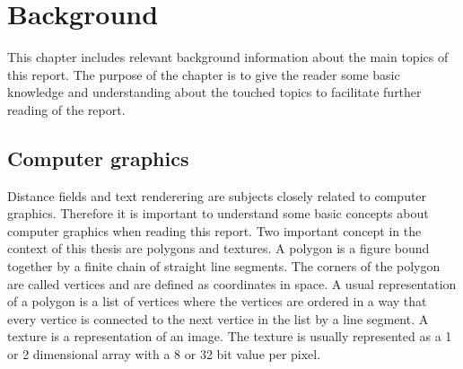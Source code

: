 \chapter{Background}\label{cha:theory}
This chapter includes relevant background information about the main topics of this report. The purpose of the chapter is to give the reader some basic knowledge and understanding about the touched topics to facilitate further reading of the report.
\section{Computer graphics}\label{computergraphics}
Distance fields and text renderering are subjects closely related to computer graphics. Therefore it is important to understand some basic concepts about computer graphics when reading this report. Two important concept in the context of this thesis are polygons and textures. A polygon is a figure bound together by a finite chain of straight line segments. The corners of the polygon are called vertices and are defined as coordinates in space. A usual representation of a polygon is a list of vertices where the vertices are ordered in a way that every vertice is connected to the next vertice in the list by a line segment. A texture is a representation of an image. The texture is usually represented as a 1 or 2 dimensional array with a 8 or 32 bit value per pixel. 

